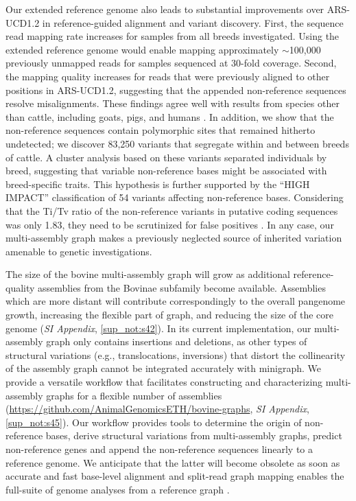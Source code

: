 \documentclass[../main.tex]{subfiles}
\begin{document}
Our extended reference genome also leads to substantial improvements over ARS-UCD1.2 in reference-guided alignment and variant discovery. First, the sequence read mapping rate increases for samples from all breeds investigated. Using the extended reference genome would enable mapping approximately $\sim$100,000 previously unmapped reads for samples sequenced at 30-fold coverage. Second, the mapping quality increases for reads that were previously aligned to other positions in ARS-UCD1.2, suggesting that the appended non-reference sequences resolve misalignments. These findings agree well with results from species other than cattle, including goats, pigs, and humans \citep{tian2019building,li2019towards,audano2019characterizing}. In addition, we show that the non-reference sequences contain polymorphic sites that remained hitherto undetected; we discover 83,250 variants that segregate within and between breeds of cattle. A cluster analysis based on these variants separated individuals by breed, suggesting that variable non-reference bases might be associated with breed-specific traits. This hypothesis is further supported by the “HIGH IMPACT” classification of 54 variants affecting non-reference bases. Considering that the Ti/Tv ratio of the non-reference variants in putative coding sequences was only 1.83, they need to be scrutinized for false positives \citep{depristo2011framework}. In any case, our multi-assembly graph makes a previously neglected source of inherited variation amenable to genetic investigations.

The size of the bovine multi-assembly graph will grow as additional reference-quality assemblies from the Bovinae subfamily become available. Assemblies which are more distant will contribute correspondingly to the overall pangenome growth, increasing the flexible part of graph, and reducing the size of the core genome (\emph{SI Appendix}, \ref{sup_not:s42}). In its current implementation, our multi-assembly graph only contains insertions and deletions, as other types of structural variations (e.g., translocations, inversions) that distort the collinearity of the assembly graph cannot be integrated accurately with minigraph. We provide a versatile workflow that facilitates constructing and characterizing multi-assembly graphs for a flexible number of assemblies (\url{https://github.com/AnimalGenomicsETH/bovine-graphs}, \emph{SI Appendix}, \ref{sup_not:s45}). Our workflow provides tools to determine the origin of non-reference bases, derive structural variations from multi-assembly graphs, predict non-reference genes and append the non-reference sequences linearly to a reference genome. We anticipate that the latter will become obsolete as soon as accurate and fast base-level alignment and split-read graph mapping enables the full-suite of genome analyses from a reference graph \citep{siren2020genotyping}.
\end{document}
